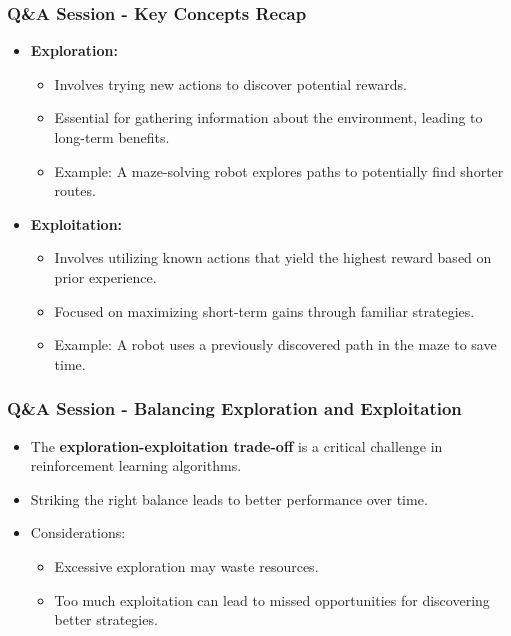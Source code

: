 \documentclass[aspectratio=169]{beamer}
\begin{document}
\begin{frame}[fragile]
    \frametitle{Q\&A Session - Key Concepts Recap}
    \begin{itemize}
        \item \textbf{Exploration:}
        \begin{itemize}
            \item Involves trying new actions to discover potential rewards.
            \item Essential for gathering information about the environment, leading to long-term benefits.
            \item Example: A maze-solving robot explores paths to potentially find shorter routes.
        \end{itemize}
        \item \textbf{Exploitation:}
        \begin{itemize}
            \item Involves utilizing known actions that yield the highest reward based on prior experience.
            \item Focused on maximizing short-term gains through familiar strategies.
            \item Example: A robot uses a previously discovered path in the maze to save time.
        \end{itemize}
    \end{itemize}
\end{frame}

\begin{frame}[fragile]
    \frametitle{Q\&A Session - Balancing Exploration and Exploitation}
    \begin{itemize}
        \item The \textbf{exploration-exploitation trade-off} is a critical challenge in reinforcement learning algorithms.
        \item Striking the right balance leads to better performance over time.
        \item Considerations:
        \begin{itemize}
            \item Excessive exploration may waste resources.
            \item Too much exploitation can lead to missed opportunities for discovering better strategies.
        \end{itemize}
    \end{itemize}
\end{frame}
\end{document}
